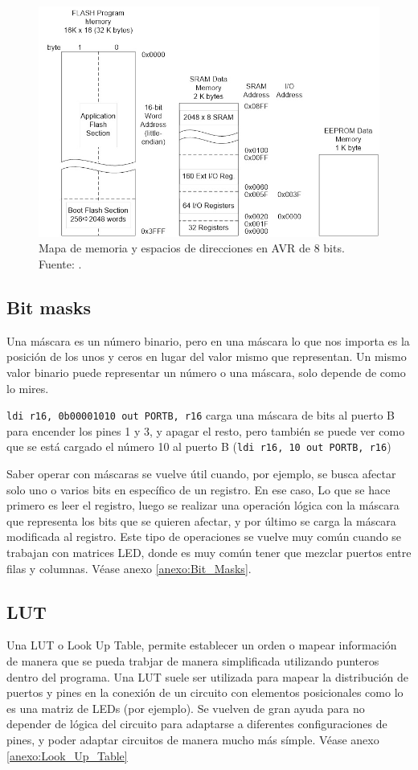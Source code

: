 \begin{figure}[H]
  \centering
  \includegraphics[width=\linewidth]{./Anexos/Memory Map.jpg}
  \caption{Mapa de memoria y espacios de direcciones en AVR de 8 bits. Fuente: \cite{arxterra_avr_addressing_modes}.}
  \label{fig:avr-memory-map}
\end{figure}

\subsection{Bit masks}
Una máscara es un número binario, pero en una máscara lo que nos importa es la posición de los unos y ceros en lugar del valor mismo que representan. Un mismo valor binario puede representar un número o una máscara, solo depende de como lo mires.  

\texttt{ldi r16, 0b00001010 out PORTB, r16} carga una máscara de bits al puerto B para encender los pines 1 y 3, y apagar el resto, pero también se puede ver como que se está cargado el número 10 al puerto B (\texttt{ldi r16, 10 out PORTB, r16})

Saber operar con máscaras se vuelve útil cuando, por ejemplo, se busca afectar solo uno o varios bits en específico de un registro. En ese caso,  Lo que se hace primero es leer el registro, luego se realizar una operación lógica con la máscara que representa los bits que se quieren afectar, y por último se carga la máscara modificada al registro. Este tipo de operaciones se vuelve muy común cuando se trabajan con matrices LED, donde es muy común tener que mezclar puertos entre filas y columnas. Véase anexo \ref{anexo:Bit_Masks}.


\subsection{LUT}
Una LUT o Look Up Table, permite establecer un orden o mapear información de manera que se pueda trabjar de manera simplificada utilizando punteros dentro del programa. Una LUT suele ser utilizada para mapear la distribución de puertos y pines en la conexión de un circuito con elementos posicionales como lo es una matriz de LEDs (por ejemplo). Se vuelven de gran ayuda para no depender de lógica del circuito para adaptarse a diferentes configuraciones de pines, y poder adaptar circuitos de manera mucho más símple. Véase anexo \ref{anexo:Look_Up_Table}


